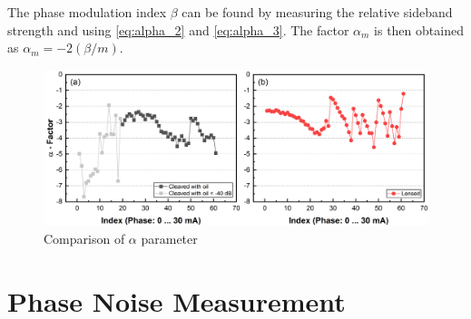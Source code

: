 The phase modulation index $\beta$ can be found by measuring the relative sideband strength and using \autoref{eq:alpha_2} and \autoref{eq:alpha_3}. The factor $\alpha_m$ is then obtained as $\alpha_m = -2(\beta/m)$.
\begin{figure}[ht]
    \centering
    \includegraphics[width=\linewidth]{figures/Alpha_Cleaved_and_Lensed.png}
    \caption{Comparison of $\alpha$ parameter}
    \label{fig:Alpha_Cleaved_and_Lensed}
\end{figure}

\section{Phase Noise Measurement}

